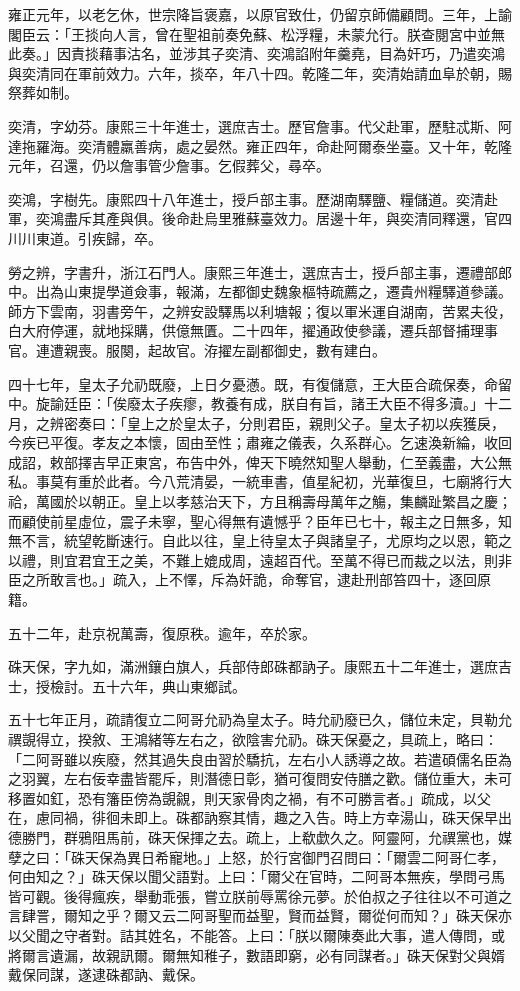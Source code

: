 \begin{pinyinscope}
雍正元年，以老乞休，世宗降旨褒嘉，以原官致仕，仍留京師備顧問。三年，上諭閣臣云：「王掞向人言，曾在聖祖前奏免蘇、松浮糧，未蒙允行。朕查閱宮中並無此奏。」因責掞藉事沽名，並涉其子奕清、奕鴻諂附年羹堯，目為奸巧，乃遣奕鴻與奕清同在軍前效力。六年，掞卒，年八十四。乾隆二年，奕清始請血阜於朝，賜祭葬如制。

奕清，字幼芬。康熙三十年進士，選庶吉士。歷官詹事。代父赴軍，歷駐忒斯、阿達拖羅海。奕清體羸善病，處之晏然。雍正四年，命赴阿爾泰坐臺。又十年，乾隆元年，召還，仍以詹事管少詹事。乞假葬父，尋卒。

奕鴻，字樹先。康熙四十八年進士，授戶部主事。歷湖南驛鹽、糧儲道。奕清赴軍，奕鴻盡斥其產與俱。後命赴烏里雅蘇臺效力。居邊十年，與奕清同釋還，官四川川東道。引疾歸，卒。

勞之辨，字書升，浙江石門人。康熙三年進士，選庶吉士，授戶部主事，遷禮部郎中。出為山東提學道僉事，報滿，左都御史魏象樞特疏薦之，遷貴州糧驛道參議。師方下雲南，羽書旁午，之辨安設驛馬以利塘報；復以軍米運自湖南，苦累夫役，白大府停運，就地採購，供億無匱。二十四年，擢通政使參議，遷兵部督捕理事官。連遭親喪。服闋，起故官。洊擢左副都御史，數有建白。

四十七年，皇太子允礽既廢，上日夕憂懣。既，有復儲意，王大臣合疏保奏，命留中。旋諭廷臣：「俟廢太子疾瘳，教養有成，朕自有旨，諸王大臣不得多瀆。」十二月，之辨密奏曰：「皇上之於皇太子，分則君臣，親則父子。皇太子初以疾獲戾，今疾已平復。孝友之本懷，固由至性；肅雍之儀表，久系群心。乞速渙新綸，收回成詔，敕部擇吉早正東宮，布告中外，俾天下曉然知聖人舉動，仁至義盡，大公無私。事莫有重於此者。今八荒清晏，一統車書，值星紀初，光華復旦，七廟將行大祫，萬國於以朝正。皇上以孝慈治天下，方且稱壽母萬年之觴，集麟趾繁昌之慶；而顧使前星虛位，震子未寧，聖心得無有遺憾乎？臣年已七十，報主之日無多，知無不言，統望乾斷速行。自此以往，皇上待皇太子與諸皇子，尤原均之以恩，範之以禮，則宜君宜王之美，不難上媲成周，遠超百代。至萬不得已而裁之以法，則非臣之所敢言也。」疏入，上不懌，斥為奸詭，命奪官，逮赴刑部笞四十，逐回原籍。

五十二年，赴京祝萬壽，復原秩。逾年，卒於家。

硃天保，字九如，滿洲鑲白旗人，兵部侍郎硃都訥子。康熙五十二年進士，選庶吉士，授檢討。五十六年，典山東鄉試。

五十七年正月，疏請復立二阿哥允礽為皇太子。時允礽廢已久，儲位未定，貝勒允禩覬得立，揆敘、王鴻緒等左右之，欲陰害允礽。硃天保憂之，具疏上，略曰：「二阿哥雖以疾廢，然其過失良由習於驕抗，左右小人誘導之故。若遣碩儒名臣為之羽翼，左右佞幸盡皆罷斥，則潛德日彰，猶可復問安侍膳之歡。儲位重大，未可移置如釭，恐有籓臣傍為覬覦，則天家骨肉之禍，有不可勝言者。」疏成，以父在，慮同禍，徘徊未即上。硃都訥察其情，趣之入告。時上方幸湯山，硃天保早出德勝門，群鴉阻馬前，硃天保揮之去。疏上，上欷歔久之。阿靈阿，允禩黨也，媒孽之曰：「硃天保為異日希寵地。」上怒，於行宮御門召問曰：「爾雲二阿哥仁孝，何由知之？」硃天保以聞父語對。上曰：「爾父在官時，二阿哥本無疾，學問弓馬皆可觀。後得瘋疾，舉動乖張，嘗立朕前辱罵徐元夢。於伯叔之子往往以不可道之言肆詈，爾知之乎？爾又云二阿哥聖而益聖，賢而益賢，爾從何而知？」硃天保亦以父聞之守者對。詰其姓名，不能答。上曰：「朕以爾陳奏此大事，遣人傳問，或將爾言遺漏，故親訊爾。爾無知稚子，數語即窮，必有同謀者。」硃天保對父與婿戴保同謀，遂逮硃都訥、戴保。


\end{pinyinscope}
